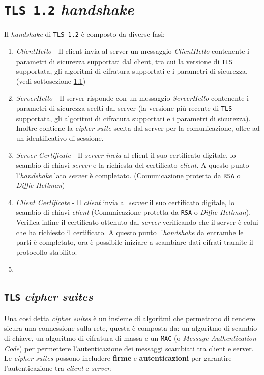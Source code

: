 \section{\texttt{TLS 1.2} \textit{handshake}}
    Il \textit{handshake} di \texttt{TLS 1.2} è composto da diverse fasi: \begin{enumerate}
        \item \textit{ClientHello} - Il client invia al server un messaggio \textit{ClientHello} contenente i parametri di sicurezza supportati dal client, tra cui la versione di \texttt{TLS} supportata, gli algoritmi di cifratura supportati e i parametri di sicurezza. (vedi sottosezione \ref{subsec:TLSciphersuites})
        \item \textit{ServerHello} - Il server risponde con un messaggio \textit{ServerHello} contenente i parametri di sicurezza scelti dal server (la versione più recente di \texttt{TLS} supportata, gli algoritmi di cifratura supportati e i parametri di sicurezza). Inoltre contiene la \textit{cipher suite} scelta dal server per la comunicazione, oltre ad un identificativo di sessione.
        \item \textit{Server Certificate} - Il \textit{server} \textit{invia} al client il suo certificato digitale, lo scambio di chiavi \textit{server} e la richiesta del certificato \textit{client}. A questo punto l'\textit{handshake} lato \textit{server} è completato. (Comunicazione protetta da \texttt{RSA} o \textit{Diffie-Hellman})
        \item \textit{Client Certificate} - Il \textit{client} invia al \textit{server} il suo certificato digitale, lo scambio di chiavi \textit{client} (Comunicazione protetta da \texttt{RSA} o \textit{Diffie-Hellman}). Verifica infine il certificato ottenuto dal \textit{server} verificando che il server è colui che ha richiesto il certificato. A questo punto l'\textit{handshake} da entrambe le parti è completato, ora è possibile iniziare a scambiare dati cifrati tramite il protocollo stabilito.
        \item 
    \end{enumerate}
    \subsection{\texttt{TLS} \textit{cipher suites}}
        \label{subsec:TLSciphersuites}
        Una cosi detta \textit{cipher suites} è un insieme di algoritmi che permettono di rendere sicura una connessione sulla rete, questa è composta da: un algoritmo di scambio di chiave, un algoritmo di cifratura di massa e un \texttt{MAC} (o \textit{Message Authentication Code}) per permettere l'autenticazione dei messaggi scambiati tra client e server. Le \textit{cipher suites} possono includere \textbf{firme} e \textbf{autenticazioni} per garantire l'autenticazione tra \textit{client} e \textit{server}.
